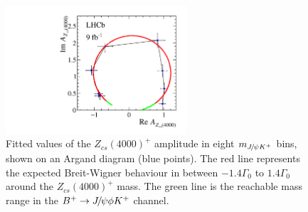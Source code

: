 \begin{figure}[!tbh]
\centering
\includegraphics[width=0.6\textwidth]{Figures/03_Zcs/06_Amplitude/Z1_argand.pdf}
\caption{Fitted values of the $Z_{cs}(4000)^+$ amplitude in eight $m_{{{J\mskip -3mu/\mskip -2mu\psi}}{{K}^+}}$ bins,
shown on an Argand diagram (blue points).
The red line represents the expected Breit-Wigner behaviour in between $-1.4\Gamma_0$ to $1.4\Gamma_0$ around the $Z_{cs}(4000)^+$ mass.
The green line is the reachable mass range in the ${{{B}^+}}\rightarrow{\ensuremath{{J\mskip -3mu/\mskip -2mu\psi}}}\phi{\ensuremath{{K}^+}}$ channel.
}
\label{fig:Argand}
\end{figure}




